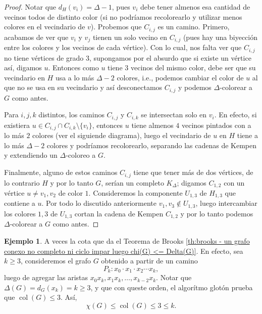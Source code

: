 \documentclass[12pt]{report}
\theoremstyle{plain}
\theoremstyle{definition}
\newtheorem{example}[theorem]{Ejemplo}
\newcommand{\col}[1]{\operatorname{col} (#1)}
\begin{document}
\begin{proof}

Notar que $d_H (v_i) = \Delta - 1$, pues $v_i$ debe tener almenos esa cantidad de vecinos todos de distinto color (si no podríamos recolorearlo y utilizar menos colores en el vecindario de $v$). Probemos que $C_{i,j}$ es un camino. Primero, acabamos de ver que $v_i$ y $v_j$ tienen un solo vecino en $C_{i,j}$ (pues hay una biyección entre los colores y los vecinos de cada vértice). Con lo cual, nos falta ver que $C_{i,j}$ no tiene vértices de grado $3$, supongamos por el absurdo que si existe un vértice así, digamos $u$. Entonces como $u$ tiene $3$ vecinos del mismo color, debe ser que su vecindario en $H$ usa a lo más $\Delta - 2$ colores, i.e., podemos cambiar el color de $u$ al que no se usa en su vecindario y así desconectamos $C_{i,j}$ y podemos $\Delta$-colorear a $G$ como antes.

Para $i,j,k$ distintos, los caminos $C_{i,j}$ y $C_{i,k}$ se intersectan solo en $v_i$. En efecto, si existiera $u \in C_{i,j} \cap C_{i,k} \setminus \{v_i\}$, entonces $u$ tiene almenos $4$ vecinos pintados con a lo más $2$ colores (ver el siguiende diagrama), luego el vecindario de $u$ en $H$ tiene a lo más $\Delta -2$ colores y podríamos recolorearlo, separando las cadenas de Kempen y extendiendo un $\Delta$-coloreo a $G$.


Finalmente, alguno de estos caminos $C_{i,j}$ tiene que tener más de dos vértices, de lo contrario $H$ y por lo tanto $G$, serían un completo $K_\Delta$; digamos $C_{1,2}$ con un vértice $u \neq v_1,v_2$ de color $1$. Consideremos la componente $U_{1,3}$ de $H_{1,3}$ que contiene a $u$. Por todo lo discutido anteriormente $v_1, v_3 \not \in U_{1,3}$, luego intercambiar los colores $1,3$ de $U_{1,3}$ cortan la cadena de Kempen $C_{1,2}$ y por lo tanto podemos $\Delta$-colorear a $G$ como antes.
\end{proof}

\begin{example}
A veces la cota que da el Teorema de Brooks \ref{th:brooks - un grafo conexo no completo ni ciclo impar luego chi(G) <= Delta(G)}. En efecto, sea $k \geq 3$, consideremos el grafo $G$ obtenido a partir de un camino
\[
    P_k : x_0 \cdot x_1 \cdot x_2 \cdots x_k,
\]
luego de agregar las aristas $x_0 x_k, x_1 x_k, \ldots, x_{k-2} x_k$. Notar que $\Delta (G) = d_G (x_k) = k \geq 3$, y que con queste orden, el algorítmo glotón prueba que $\col G \leq 3$. Así,
\[
    \chi (G) \leq \col G \leq 3 \leq k.
\]

\end{example}
\end{document}
